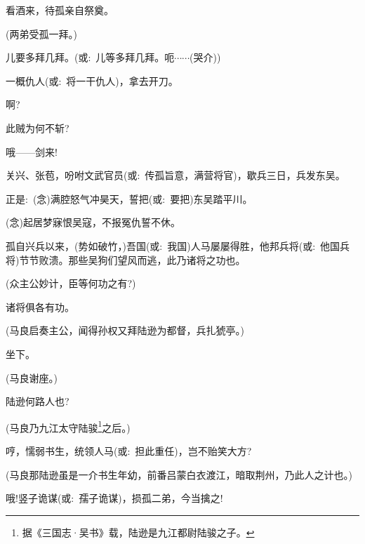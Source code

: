 {

看酒来，待孤亲自祭奠。

(两弟受孤一拜。)

儿要多拜几拜。({\akai 或}:~儿等多拜几拜。呃$\cdots{}\cdots{}$({\hwfs 哭介}))

一概仇人({\akai 或}:~将一干仇人)，拿去开刀。

啊?

此贼为何不斩?

哦------剑来!


关兴、张苞，吩咐文武官员({\akai 或}:~传孤旨意，满营将官)，歇兵三日，兵发东吴。

正是:~({\akai 念})满腔怒气冲昊天，誓把({\akai 或}:~要把)东吴踏平川。

\vspace{5pt}

({\akai 念})起居梦寐恨吴寇，不报冤仇誓不休。

孤自兴兵以来，(势如破竹，)吾国({\akai 或}:~我国)人马屡屡得胜，他邦兵将({\akai 或}:~他国兵将)节节败溃。那些吴狗们望风而逃，此乃诸将之功也。

(众\hspace{40pt}主公妙计，臣等何功之有?)

诸将俱各有功。

(马良\hspace{30pt}启奏主公，闻得孙权又拜陆逊为都督，兵扎猇亭。)

坐下。

(马良\hspace{30pt}谢座。)

陆逊何路人也?

(马良\hspace{30pt}乃九江太守陆骏\footnote{据《三国志·吴书》载，陆逊是九江都尉陆骏之子。}之后。)

哼，懦弱书生，统领人马({\akai 或}:~担此重任)，岂不贻笑大方?

(马良\hspace{30pt}那陆逊虽是一介书生年幼，前番吕蒙白衣渡江，暗取荆州，乃此人之计也。)

哦!竖子诡谋({\akai 或}:~孺子诡谋)，损孤二弟，今当擒之!

}
